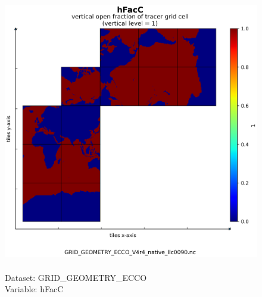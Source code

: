 \begin{figure}[H]
\centering
\includegraphics[scale=0.5]{../images/plots/native_plots_coords/Geometry_Parameters_for_the_Lat-Lon-Cap_90_(llc90)_Native_Model_Grid_(Version_4_Release_4)/hFacC.png}
\caption{\\Dataset: GRID\_GEOMETRY\_ECCO\\Variable: hFacC}
\label{tab:table-GRID_GEOMETRY_ECCO_hFacC-Plot}
\end{figure}
\pagebreak
